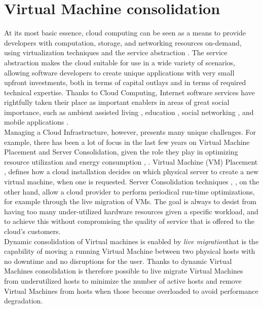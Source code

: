 
\section{Virtual Machine consolidation}
\label{sec:sota_vm_cons}

At its most basic essence, cloud computing can be seen as a means to provide developers with computation, storage, and networking resources on-demand, using virtualization techniques and the service abstraction \cite{Armbrust:2010ee}. The service abstraction makes the cloud suitable for use in a wide variety of scenarios, allowing software developers to create unique applications with very small upfront investments, both in terms of capital outlays and in terms of required technical expertise. Thanks to Cloud Computing, Internet software services have rightfully taken their place as important enablers in areas of great social importance, such as ambient assisted living \cite{Zhang:2011dq}, education \cite{Sultan:2010fd}, social networking \cite{Chard:2010eh}, and mobile applications \cite{Fernando:2013ip}.\\
Managing a Cloud Infrastructure, however, presents many unique challenges. For example, there has been a lot of focus in the last few years on Virtual Machine Placement and Server Consolidation, given the role they play in optimizing resource utilization and energy consumption \cite{Feller:2012kf}, \cite{Goudarzi:2012gw}. Virtual Machine (VM) Placement \cite{Meng:2010im}, \cite{Xu:2010df} defines how a cloud installation decides on which physical server to create a new virtual machine, when one is requested. Server Consolidation techniques \cite{Wuhib:2012vq}, \cite{Corradi:2014fe}, on the other hand, allow a cloud provider to perform periodical run-time optimizations, for example through the live migration of VMs. The goal is always to desist from having too many under-utilized hardware resources given a specific workload, and to achieve this without compromising the quality of service that is offered to the cloud’s customers.\\
Dynamic consolidation of Virtual machines is enabled by \textit{live migration}that is the capability of moving a running Virtual Machine between two physical hosts with no downtime and no disruptions for the user. Thanks to dynamic Virtual Machines consolidation is therefore possible to live migrate Virtual Machines from underutilized hosts to minimize the number of active hosts and remove Virtual Machines from hosts when those become overloaded to avoid performance degradation.

